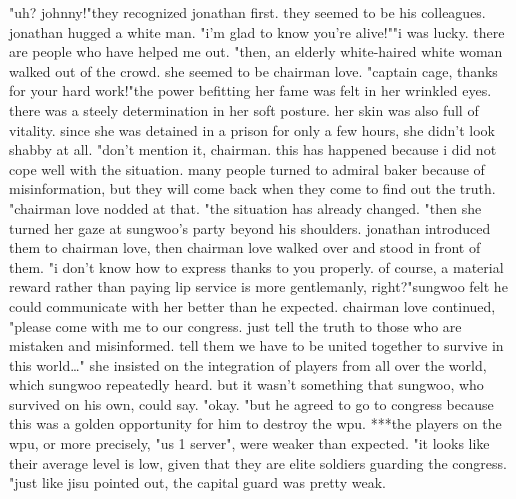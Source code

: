 "uh? johnny!"they recognized jonathan first.
 they seemed to be his colleagues.
jonathan hugged a white man.
"i'm glad to know you're alive!""i was lucky.
 there are people who have helped me out.
"then, an elderly white-haired white woman walked out of the crowd.
 she seemed to be chairman love.
"captain cage, thanks for your hard work!"the power befitting her fame was felt in her wrinkled eyes.
 there was a steely determination in her soft posture.
 her skin was also full of vitality.
 since she was detained in a prison for only a few hours, she didn't look shabby at all.
"don't mention it, chairman.
 this has happened because i did not cope well with the situation.
 many people turned to admiral baker because of misinformation, but they will come back when they come to find out the truth.
"chairman love nodded at that.
 "the situation has already changed.
"then she turned her gaze at sungwoo's party beyond his shoulders.
 jonathan introduced them to chairman love, then chairman love walked over and stood in front of them.
"i don't know how to express thanks to you properly.
 of course, a material reward rather than paying lip service is more gentlemanly, right?"sungwoo felt he could communicate with her better than he expected.
chairman love continued, "please come with me to our congress.
 just tell the truth to those who are mistaken and misinformed.
 tell them we have to be united together to survive in this world…" she insisted on the integration of players from all over the world, which sungwoo repeatedly heard.
 but it wasn't something that sungwoo, who survived on his own, could say.
"okay.
"but he agreed to go to congress because this was a golden opportunity for him to destroy the wpu.
***the players on the wpu, or more precisely, "us 1 server", were weaker than expected.
"it looks like their average level is low, given that they are elite soldiers guarding the congress.
"just like jisu pointed out, the capital guard was pretty weak.
 

